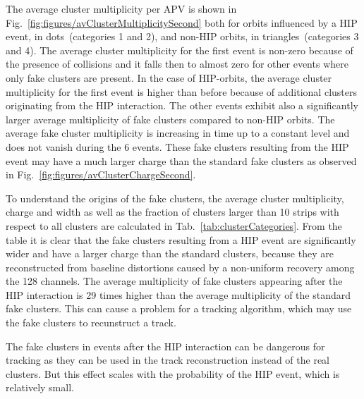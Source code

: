 The average cluster multiplicity per APV is shown in Fig.~\ref{fig:figures/avClusterMultiplicitySecond} both for orbits influenced by a HIP event, in dots~(categories 1 and 2), and non-HIP orbits, in triangles~(categories 3 and 4). The average cluster multiplicity for the first event is non-zero because of the presence of collisions and it falls then to almost zero for other events where only fake clusters are present. In the case of HIP-orbits, the average cluster multiplicity for the first event is higher than before because of additional clusters originating from the HIP interaction. The other events exhibit also a significantly larger average multiplicity of fake clusters compared to non-HIP orbits. The average fake cluster multiplicity is increasing in time up to a constant level and does not vanish during the 6 events. These fake clusters resulting from the HIP event may have a much larger charge than the standard fake clusters as observed in Fig.~\ref{fig:figures/avClusterChargeSecond}. 

To understand the origins of the fake clusters, the average cluster multiplicity, charge and width as well as the fraction of clusters larger than 10 strips with respect to all clusters are calculated in Tab.~\ref{tab:clusterCategories}. From the table it is clear that the fake clusters resulting from a HIP event are significantly wider and have a larger charge than the standard clusters, because they are reconstructed from baseline distortions caused by a non-uniform recovery among the 128 channels. The average multiplicity of fake clusters appearing after the HIP interaction is 29 times higher than the average multiplicity of the standard fake clusters. This can cause a problem for a tracking algorithm, which may use the fake clusters to recunstruct a track.



The fake clusters in events after the HIP interaction can be dangerous for tracking as they can be used in the track reconstruction instead of the real clusters. But this effect scales with the probability of the HIP event, which is relatively small.

